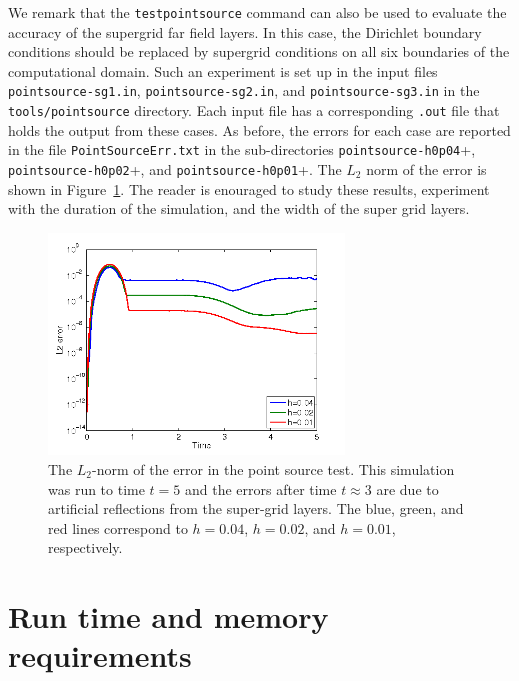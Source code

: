 \documentclass[11pt]{report}
\begin{document}
We remark that the \verb+testpointsource+ command can also be used to evaluate the accuracy of the
supergrid far field layers. In this case, the Dirichlet boundary conditions should be replaced by
supergrid conditions on all six boundaries of the computational domain. Such an experiment is set up
in the input files \verb+pointsource-sg1.in+, \verb+pointsource-sg2.in+, and
\verb+pointsource-sg3.in+ in the \verb+tools/pointsource+ directory. Each input file has a
corresponding \verb+.out+ file that holds the output from these cases. As before, the errors for
each case are reported in the file \verb+PointSourceErr.txt+ in the sub-directories
\verb+pointsource-h0p04++, \verb+pointsource-h0p02++, and \verb+pointsource-h0p01++. The $L_2$ norm
of the error is shown in Figure~\ref{fig:sg-error}. The reader is enouraged to study these results,
experiment with the duration of the simulation, and the width of the super grid layers.
\begin{figure}[ht]
\begin{center}
\includegraphics[width=0.7\textwidth]{sg-ps-err.png}
\caption{The $L_2$-norm of the error in the point source test. This simulation was run to time $t=5$
  and the errors after time $t\approx 3$ are due to artificial reflections from the super-grid
  layers. The blue, green, and red lines 
  correspond to $h=0.04$, $h=0.02$, and $h=0.01$, respectively.}
\label{fig:sg-error}
\end{center}
\end{figure}

\chapter{Run time and memory requirements }\label{sec:performance}
\end{document}
